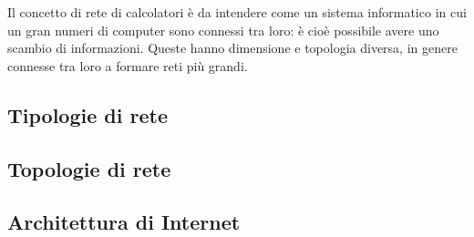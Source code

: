 \documentclass{subfiles}
\begin{document}
Il concetto di rete di calcolatori è da intendere come un sistema informatico in cui un gran numeri di computer sono connessi tra loro:
è cioè possibile avere uno scambio di informazioni.
Queste hanno dimensione e topologia diversa, in genere connesse tra loro a formare reti più grandi.

\subsection{Tipologie di rete}


\subsection{Topologie di rete}


\subsection{Architettura di Internet}

\clearpage
\end{document}

